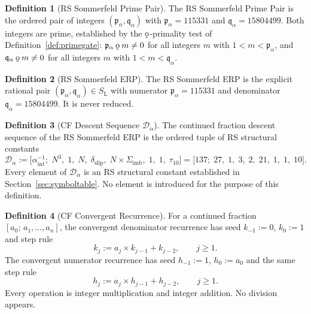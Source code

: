 \documentclass[11pt, letterpaper]{article}
\newcommand{\SL}{S_{\mathrm{L}}}
\newcommand{\koppa}{\mathbin{\text{\rm\k{o}}}}
\newcommand{\Sigimb}{\Sigma_{\mathrm{imb}}}
\newcommand{\dslip}{\delta_{\mathrm{slip}}}
\newcommand{\tauX}{\tau_{10}}
\newcommand{\aSC}{\alpha^{-1}_{\mathrm{int}}}
\newcommand{\pa}{\mathfrak{p}_\alpha}
\newcommand{\qa}{\mathfrak{q}_\alpha}
\newcommand{\Da}{\mathcal{D}_\alpha}
\theoremstyle{definition}
\newtheorem{definition}{Definition}[section]
\theoremstyle{plain}
\begin{document}

\begin{definition}[RS Sommerfeld Prime Pair]\label{def:sommerfeld-pair}
The RS Sommerfeld Prime Pair is the ordered pair of integers $(\pa,\qa)$ with
$\pa=115331$ and $\qa=15804499$.  Both integers are prime, established by the
$\koppa$-primality test of Definition~\ref{def:primegate}: $\pa\koppa m\neq 0$
for all integers $m$ with $1<m<\pa$, and $\qa\koppa m\neq 0$ for all integers
$m$ with $1<m<\qa$.
\end{definition}

\begin{definition}[RS Sommerfeld ERP]\label{def:sommerfeld-erp}
The RS Sommerfeld ERP is the explicit rational pair $(\pa,\qa)\in\SL$ with
numerator $\pa=115331$ and denominator $\qa=15804499$.  It is never reduced.
\end{definition}

\begin{definition}[CF Descent Sequence $\Da$]\label{def:Da}
The continued fraction descent sequence of the RS Sommerfeld ERP is the
ordered tuple of RS structural constants
\begin{equation}
\Da := \bigl[\aSC;\;N^3,\;1,\;N,\;\dslip,\;N\times\Sigimb,\;
1,\;1,\;\tauX\bigr]
= \bigl[137;\;27,\;1,\;3,\;2,\;21,\;1,\;1,\;10\bigr].
\label{eq:Da}
\end{equation}
Every element of $\Da$ is an RS structural constant established in
Section~\ref{sec:symboltable}.  No element is introduced for the purpose of
this definition.
\end{definition}

\begin{definition}[CF Convergent Recurrence]\label{def:cf-recurrence}
For a continued fraction $[a_0;\,a_1,\ldots,a_n]$, the convergent denominator
recurrence has seed $k_{-1}:=0$, $k_0:=1$ and step rule
\[
k_j := a_j\times k_{j-1}+k_{j-2},\qquad j\geq 1.
\]
The convergent numerator recurrence has seed $h_{-1}:=1$, $h_0:=a_0$ and the
same step rule
\[
h_j := a_j\times h_{j-1}+h_{j-2},\qquad j\geq 1.
\]
Every operation is integer multiplication and integer addition.  No division
appears.
\end{definition}
\end{document}
